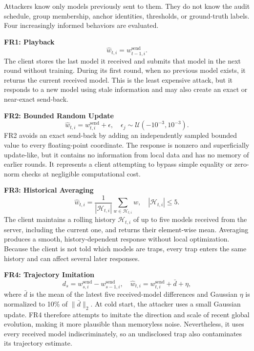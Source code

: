 \documentclass[conference]{IEEEtran}
\begin{document}
Attackers know only models previously sent to them. They do not know the audit schedule, group membership, anchor identities, thresholds, or ground-truth labels. Four increasingly informed behaviors are evaluated.

\medskip\noindent\textbf{FR1: Playback}
\begin{equation}
\widehat w_{t,i}=w^{\mathrm{send}}_{t-1,i}.
\end{equation}
The client stores the last model it received and submits that model in the next round without training. During its first round, when no previous model exists, it returns the current received model. This is the least expensive attack, but it responds to a new model using stale information and may also create an exact or near-exact send-back.

\medskip\noindent\textbf{FR2: Bounded Random Update}
\begin{equation}
\widehat w_{t,i}=w^{\mathrm{send}}_{t,i}+\epsilon,
\quad \epsilon_j\sim\mathcal U(-10^{-3},10^{-3}).
\end{equation}
FR2 avoids an exact send-back by adding an independently sampled bounded value to every floating-point coordinate. The response is nonzero and superficially update-like, but it contains no information from local data and has no memory of earlier rounds. It represents a client attempting to bypass simple equality or zero-norm checks at negligible computational cost.

\medskip\noindent\textbf{FR3: Historical Averaging}
\begin{equation}
\widehat w_{t,i}=\frac{1}{|\mathcal H_{t,i}|}
\sum_{w\in\mathcal H_{t,i}}w,
\quad |\mathcal H_{t,i}|\leq 5.
\end{equation}
The client maintains a rolling history $\mathcal H_{t,i}$ of up to five models received from the server, including the current one, and returns their element-wise mean. Averaging produces a smooth, history-dependent response without local optimization. Because the client is not told which models are traps, every trap enters the same history and can affect several later responses.

\medskip\noindent\textbf{FR4: Trajectory Imitation}
\begin{equation}
d_s=w^{\mathrm{send}}_{s,i}-w^{\mathrm{send}}_{s-1,i},\quad
\widehat w_{t,i}=w^{\mathrm{send}}_{t,i}+\bar d+\eta,
\end{equation}
where $\bar d$ is the mean of the latest five received-model differences and Gaussian $\eta$ is normalized to 10\% of $\lVert\bar d\rVert_2$. At cold start, the attacker uses a small Gaussian update. FR4 therefore attempts to imitate the direction and scale of recent global evolution, making it more plausible than memoryless noise. Nevertheless, it uses every received model indiscriminately, so an undisclosed trap also contaminates its trajectory estimate.
\end{document}
